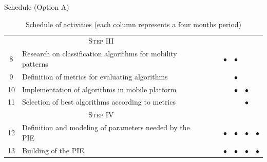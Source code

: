 \documentclass[10pt,xcolor={dvipsnames},handout]{beamer}
\newcommand{\markdone}{\textcolor{PineGreen}{$\bullet$}}
\newcommand{\markonprogress}{\textcolor{colorAzulBienBonito}{$\bullet$}}
\begin{document}
\begin{frame}{Schedule (Option A)}
\begin{table}[]
{\begin{tabular}{clccccccc}
\multicolumn{2}{c}{\textsc{Step III}}                                              &  &  &  &  &  &  &  \\
8  & Research on classification algorithms for mobility patterns                   &  &  &  & \markdone & \markdone &  &  \\
9  & Definition of metrics for evaluating algorithms                               &  &  &  &  & \markdone &  &  \\
10 & Implementation of algorithms in mobile platform                               &  &  &  &  & \markdone & \markdone  &  \\
11 & Selection of best algorithms according to metrics                             &  &  &  &  &  & \markdone &  \vspace{1em}\\

\multicolumn{2}{c}{\textsc{Step IV}}                                               &  &  &  &  &  &  &  \\
12 & Definition and modeling of parameters needed by the PIE                       &  &  &  & \markdone & \markdone & \markdone & \markonprogress \\
13 & Building of the PIE                                                           &  &  &  & \markdone & \markdone & \markdone & \markonprogress \\
\bottomrule
\end{tabular}%
}
\caption{Schedule of activities (each column represents a four months period)}
\label{tbl:schedule-part-one}
\end{table}
\end{frame}
\end{document}
